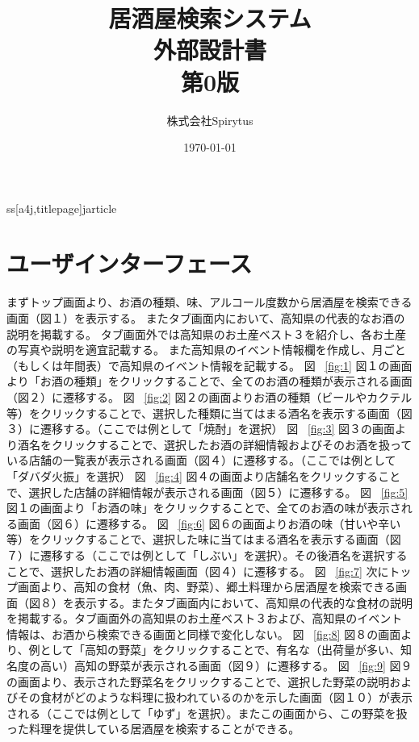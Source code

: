 ss[a4j,titlepage]{jarticle}
\usepackage[dvipdfmx]{graphicx}
\usepackage{ascmac}
\usepackage{url}

\title{居酒屋検索システム\\
外部設計書\\
第0版}
\author{株式会社Spirytus}
\date{\today}


\maketitle
\tableofcontents

\section{ユーザインターフェース}
まずトップ画面より、お酒の種類、味、アルコール度数から居酒屋を検索できる画面（図１）を表示する。
またタブ画面内において、高知県の代表的なお酒の説明を掲載する。
タブ画面外では高知県のお土産ベスト３を紹介し、各お土産の写真や説明を適宜記載する。
また高知県のイベント情報欄を作成し、月ごと（もしくは年間表）で高知県のイベント情報を記載する。
図 ~\ref{fig:1}
図１の画面より「お酒の種類」をクリックすることで、全てのお酒の種類が表示される画面（図２）に遷移する。
図 ~\ref{fig:2}
図２の画面よりお酒の種類（ビールやカクテル等）をクリックすることで、選択した種類に当てはまる酒名を表示する画面（図３）に遷移する。（ここでは例として「焼酎」を選択）
図 ~\ref{fig:3}
図３の画面より酒名をクリックすることで、選択したお酒の詳細情報およびそのお酒を扱っている店舗の一覧表が表示される画面（図４）に遷移する。（ここでは例として「ダバダ火振」を選択）
図 ~\ref{fig:4}
図４の画面より店舗名をクリックすることで、選択した店舗の詳細情報が表示される画面（図５）に遷移する。
図 ~\ref{fig:5}
図１の画面より「お酒の味」をクリックすることで、全てのお酒の味が表示される画面（図６）に遷移する。
図 ~\ref{fig:6}
図６の画面よりお酒の味（甘いや辛い等）をクリックすることで、選択した味に当てはまる酒名を表示する画面（図７）に遷移する（ここでは例として「しぶい」を選択）。その後酒名を選択することで、選択したお酒の詳細情報画面（図４）に遷移する。
図 ~\ref{fig:7}
次にトップ画面より、高知の食材（魚、肉、野菜）、郷土料理から居酒屋を検索できる画面（図８）を表示する。またタブ画面内において、高知県の代表的な食材の説明を掲載する。タブ画面外の高知県のお土産ベスト３および、高知県のイベント情報は、お酒から検索できる画面と同様で変化しない。
図 ~\ref{fig:8}
図８の画面より、例として「高知の野菜」をクリックすることで、有名な（出荷量が多い、知名度の高い）高知の野菜が表示される画面（図９）に遷移する。
図 ~\ref{fig:9}
図９の画面より、表示された野菜名をクリックすることで、選択した野菜の説明およびその食材がどのような料理に扱われているのかを示した画面（図１０）が表示される（ここでは例として「ゆず」を選択）。またこの画面から、この野菜を扱った料理を提供している居酒屋を検索することができる。
